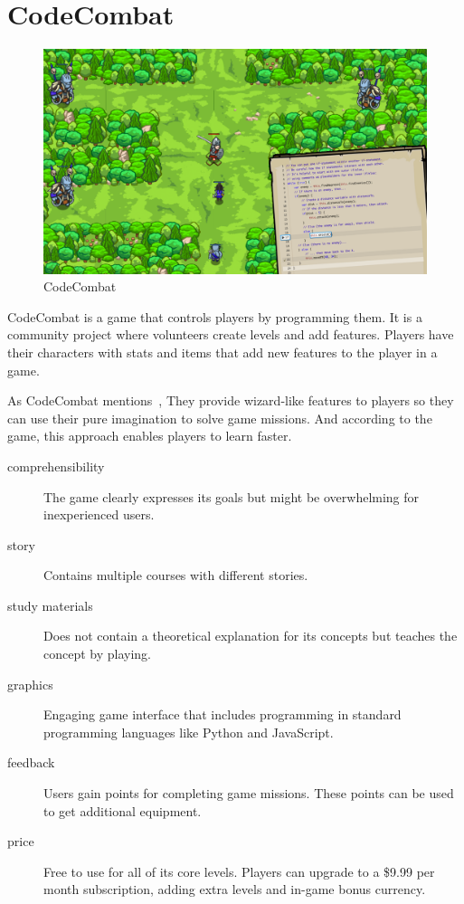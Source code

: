 \newpage
\section{CodeCombat}
\label{similar-games:code-combat}

\begin{figure}
    \centering
    \includegraphics[width=1\linewidth]{assets/similar-games/codecombat.png}
    \caption{CodeCombat~\cite{a2022_codecombat}}
    \label{fig:codecombat}
\end{figure}

CodeCombat is a game that controls players by programming them.
It is a community project where volunteers create levels and add features.
Players have their characters with stats and items that add new features to the player in a game.

As CodeCombat mentions~\cite{a2022_codecombat}, 
They provide wizard-like features to players so they can use their pure imagination to solve game missions.
And according to the game, this approach enables players to learn faster.

\begin{description}
    \item[comprehensibility] The game clearly expresses its goals but might be overwhelming for inexperienced users.
    \item[story] Contains multiple courses with different stories.  
    \item[study materials] Does not contain a theoretical explanation for its concepts but teaches the concept by playing.
    \item[graphics] Engaging game interface that includes programming in standard programming languages like Python and JavaScript. 
    \item[feedback] Users gain points for completing game missions. These points can be used to get additional equipment.
    \item[price] Free to use for all of its core levels. Players can upgrade to a \$9.99 per month subscription, adding extra levels and in-game bonus currency.
\end{description}

